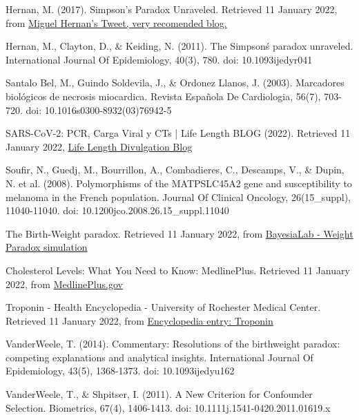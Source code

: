 \documentclass{article}
\begin{document}
Hernan, M. (2017). Simpson's Paradox Unraveled. Retrieved 11 January 2022, from \href{https://twitter.com/_MiguelHernan/status/860542619818106881?s=20}{Miguel Hernan's Tweet, very recomended blog.}

Hernan, M., Clayton, D., \& Keiding, N. (2011). The Simpson\'s paradox unraveled. International Journal Of Epidemiology, 40(3), 780. doi: 10.1093\/ije\/dyr041

Santalo Bel, M., Guindo Soldevila, J., \& Ordonez Llanos, J. (2003). Marcadores biológicos de necrosis miocardica. Revista Española De Cardiologia, 56(7), 703-720. doi: 10.1016\/s0300-8932(03)76942-5

SARS-CoV-2: PCR, Carga Viral y CTs | Life Length BLOG (2022). Retrieved 11 January 2022, \href{from https://lifelength.com/es/sars-cov-2-pcr-carga-viral-y-cts/}{Life Length Divulgation Blog}

Soufir, N., Guedj, M., Bourrillon, A., Combadieres, C., Descamps, V., \& Dupin, N. et al. (2008). Polymorphisms of the MATP\/SLC45A2 gene and susceptibility to melanoma in the French population. Journal Of Clinical Oncology, 26(15\_suppl), 11040-11040. doi: 10.1200\/jco.2008.26.15\_suppl.11040

The Birth-Weight paradox. Retrieved 11 January 2022, from \href{https://library.bayesia.com/articles/#!bayesialab-knowledge-hub/the-birth-weight-paradox}{BayesiaLab - Weight Paradox simulation}

Cholesterol Levels: What You Need to Know: MedlinePlus. Retrieved 11 January 2022, from \href{https://medlineplus.gov/cholesterollevelswhatyouneedtoknow.html}{MedlinePlus.gov}

Troponin - Health Encyclopedia - University of Rochester Medical Center. Retrieved 11 January 2022, from \href{https://www.urmc.rochester.edu/encyclopedia/content.aspx?contenttypeid=167&contentid=troponin}{Encyclopedia entry: Troponin}

VanderWeele, T. (2014). Commentary: Resolutions of the birthweight paradox: competing explanations and analytical insights. International Journal Of Epidemiology, 43(5), 1368-1373. doi: 10.1093\/ije\/dyu162

VanderWeele, T., \& Shpitser, I. (2011). A New Criterion for Confounder Selection. Biometrics, 67(4), 1406-1413. doi: 10.1111\/j.1541-0420.2011.01619.x
\end{document}
